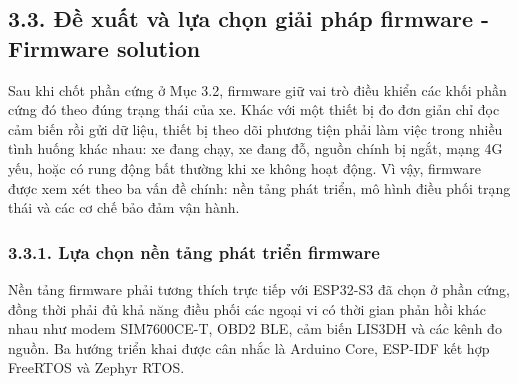 \documentclass[a4paper]{extarticle}
\begin{document}
\subsection{3.3. Đề xuất và lựa chọn giải pháp firmware - Firmware solution}\label{ux111ux1ec1-xuux1ea5t-vuxe0-lux1ef1a-chux1ecdn-giux1ea3i-phuxe1p-firmware---firmware-solution}

Sau khi chốt phần cứng ở Mục 3.2, firmware giữ vai trò điều khiển các khối
phần cứng đó theo đúng trạng thái của xe. Khác với một thiết bị đo đơn giản chỉ
đọc cảm biến rồi gửi dữ liệu, thiết bị theo dõi phương tiện phải làm việc trong
nhiều tình huống khác nhau: xe đang chạy, xe đang đỗ, nguồn chính bị ngắt, mạng
4G yếu, hoặc có rung động bất thường khi xe không hoạt động. Vì vậy, firmware
được xem xét theo ba vấn đề chính: nền tảng phát triển, mô hình điều phối trạng
thái và các cơ chế bảo đảm vận hành.

\subsubsection{3.3.1. Lựa chọn nền tảng phát triển firmware}\label{lux1ef1a-chux1ecdn-nux1ec1n-tux1ea3ng-phuxe1t-triux1ec3n-firmware}

Nền tảng firmware phải tương thích trực tiếp với ESP32-S3 đã chọn ở phần cứng,
đồng thời phải đủ khả năng điều phối các ngoại vi có thời gian phản hồi khác
nhau như modem SIM7600CE-T, OBD2 BLE, cảm biến LIS3DH và các kênh đo nguồn. Ba
hướng triển khai được cân nhắc là Arduino Core, ESP-IDF kết hợp FreeRTOS và
Zephyr RTOS.
\end{document}
